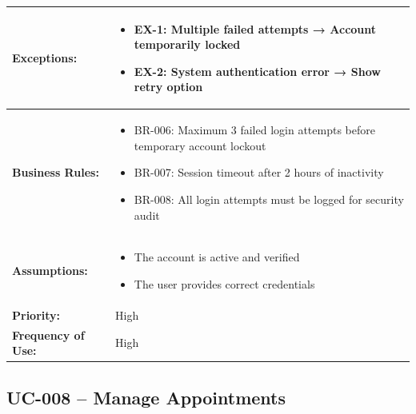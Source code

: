 \documentclass[12pt,a4paper]{article}
\begin{document}
\begin{longtable}{|p{4.5cm}|p{10.5cm}|}
\textbf{Exceptions:} &
\begin{itemize}
  \item EX-1: Multiple failed attempts → Account temporarily locked
  \item EX-2: System authentication error → Show retry option
\end{itemize} \\
\hline
\textbf{Business Rules:} &
\begin{itemize}
  \item BR-006: Maximum 3 failed login attempts before temporary account lockout
  \item BR-007: Session timeout after 2 hours of inactivity
  \item BR-008: All login attempts must be logged for security audit
\end{itemize} \\
\hline
\textbf{Assumptions:} &
\begin{itemize}
  \item The account is active and verified
  \item The user provides correct credentials
\end{itemize} \\
\hline
\textbf{Priority:} & High \\
\hline
\textbf{Frequency of Use:} & High \\
\hline
\end{longtable}

\subsection{UC-008 – Manage Appointments}
\end{document}
